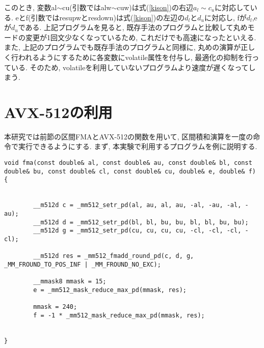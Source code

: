 \documentclass[11pt,a4paper]{jsreport}
\theoremstyle{definition}
\begin{document}
このとき, 変数al$\sim$cu(引数ではalw$\sim$cuw)は式(\ref{kison})の右辺$a_l \sim c_u$に対応している. eとf(引数ではresupwとresdown)は式(\ref{kison})の左辺の$d_l$と$d_u$に対応し, fが$d_l$,eが$d_u$である. 上記プログラムを見ると, 既存手法のプログラムと比較して丸めモードの変更が1回文少なくなっているため, これだけでも高速になったといえる. また, 上記のプログラムでも既存手法のプログラムと同様に, 丸めの演算が正しく行われるようにするために各変数にvolatile属性を付与し, 最適化の抑制を行っている. そのため, volatileを利用していないプログラムより速度が遅くなってしまう.
\section{AVX-512の利用}
		本研究では前節の区間FMAとAVX-512の関数を用いて, 区間積和演算を一度の命令で実行できるようにする. まず, 本実験で利用するプログラムを例に説明する.

\begin{lstlisting}[caption = 区間積和演算の計算部分]
void fma(const double& al, const double& au, const double& bl, const double& bu, const double& cl, const double& cu, double& e, double& f)
{
   
    
        __m512d c = _mm512_setr_pd(al, au, al, au, -al, -au, -al, -au);
        __m512d d = _mm512_setr_pd(bl, bl, bu, bu, bl, bl, bu, bu);
        __m512d g = _mm512_setr_pd(cu, cu, cu, cu, -cl, -cl, -cl, -cl);

        __m512d res = _mm512_fmadd_round_pd(c, d, g, _MM_FROUND_TO_POS_INF | _MM_FROUND_NO_EXC);

        __mmask8 mmask = 15;
        e = _mm512_mask_reduce_max_pd(mmask, res);

        mmask = 240;
        f = -1 * _mm512_mask_reduce_max_pd(mmask, res);


}
\end{lstlisting}
\end{document}
